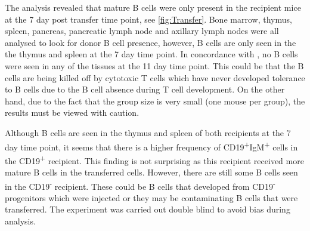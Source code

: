 
The analysis revealed that mature B cells were only present in the recipient mice at the 7 day post transfer time point, see \cref{fig:Transfer}.
Bone marrow, thymus, spleen, pancreas, pancreatic lymph node and axillary lymph nodes were all analysed to look for donor B cell presence, however, B cells are only seen in the the thymus and spleen at the 7 day time point.
In concordance with \citet{Serreze1998}, no B cells were seen in any of the tissues at the 11 day time point.
This could  be that the B cells are being killed off by cytotoxic T cells which have never developed tolerance to B cells due to the B cell absence during T cell development.
On the other hand, due to the fact that the group size is very small (one mouse per group), the results must be viewed with caution.

Although B cells are seen in the thymus and spleen of both recipients at the 7 day time point, it seems that there is a higher frequency of CD19\textsuperscript{+}IgM\textsuperscript{+} cells in the CD19\textsuperscript{+} recipient.
This finding is not surprising as this recipient received more mature B cells in the transferred cells.
However, there are still some B cells seen in the CD19\textsuperscript{-} recipient.
These could be B cells that developed from CD19\textsuperscript{-} progenitors which were injected or they may be contaminating B cells that were transferred.
The experiment was carried out double blind to avoid bias during analysis.

